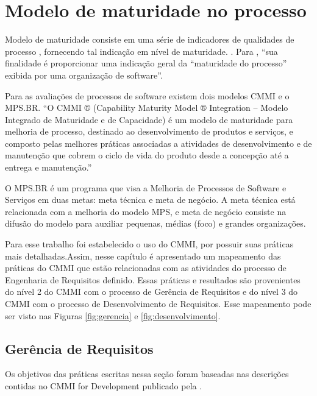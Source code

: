 \chapter{Modelo de maturidade no processo}

Modelo de maturidade consiste em uma série de indicadores de qualidades de processo , fornecendo tal indicação em nível de maturidade. \cite{pressman}. Para , “sua finalidade é proporcionar uma indicação geral da “maturidade do processo” exibida por uma organização de software”.

Para as avaliações de processos de software existem dois modelos CMMI e o MPS.BR. “O CMMI ® (Capability Maturity Model ® Integration – Modelo Integrado de Maturidade e de Capacidade) é um modelo de maturidade para melhoria de processo, destinado ao desenvolvimento de produtos e serviços, e composto pelas melhores práticas associadas a atividades de desenvolvimento e de manutenção que cobrem o ciclo de vida do produto desde a concepção até a entrega e manutenção.” \cite{cmmi}

O MPS.BR é um programa que visa a Melhoria de Processos de Software e Serviços em duas metas: meta técnica e meta de negócio. A meta técnica está relacionada com a melhoria do modelo MPS, e meta de negócio consiste na difusão do modelo para auxiliar pequenas, médias (foco) e grandes organizações. \cite{mps}

Para esse trabalho foi estabelecido o uso do CMMI, por possuir suas práticas mais detalhadas.Assim, nesse capítulo
é apresentado um mapeamento das práticas do CMMI que estão relacionadas com as atividades do processo 
de Engenharia de Requisitos definido. Essas práticas e resultados são provenientes do nível 2 do CMMI com o processo
de Gerência de Requisitos e do nível 3 do CMMI com o processo de Desenvolvimento de Requisitos. Esse mapeamento pode
ser visto nas Figuras \ref{fig:gerencia} e \ref{fig:desenvolvimento}.

\section{Gerência de Requisitos}

Os objetivos das práticas escritas nessa seção foram baseadas nas descrições contidas no CMMI for Development publicado pela .

